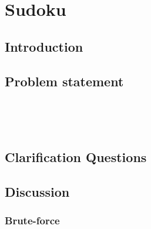 %

\chapter{Sudoku}
\label{ch:sudoku}
\section*{Introduction}

\section{Problem statement}
\begin{exercise}

\end{exercise}


\begin{example}
	\hfill \
	
\end{example}

\begin{example}
	\hfill \
	
\end{example}

\section{Clarification Questions}

\begin{QandA}
	\item 
	\begin{answered}
		\textit{}
	\end{answered}
	
\end{QandA}

\section{Discussion}
\label{sudoku:sec:discussion}


\subsection{Brute-force}
\label{sudoku:sec:bruteforce}



